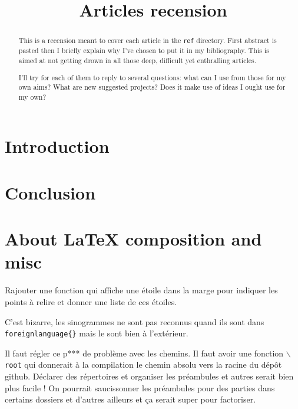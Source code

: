 \documentclass[12pt,onecolumn]{article} %
\title{Articles recension}
\author{}
\begin{document}
\maketitle
{}
\begin{abstract}
\par This is a recension meant to cover each article in the \texttt{ref} directory. First abstract is pasted then I briefly explain why I've chosen to put it in my bibliography. This is aimed at not getting drown in all those deep, difficult yet enthralling articles.\par I'll try for each of them to reply to several questions: what can I use from those for my own aims? What are new suggested projects? Does it make use of ideas I ought use for my own?
\end{abstract}

\tableofcontents
\cleardoublepage

\section*{Introduction}

\section{}


\section*{Conclusion}

\section*{About \LaTeX{} composition and misc}
Rajouter une fonction qui affiche une étoile dans la marge pour indiquer les points à relire et donner une liste de ces étoiles.

C'est bizarre, les sinogrammes ne sont pas reconnus quand ils sont dans \texttt{foreignlanguage\{\}} mais le sont bien à l'extérieur.

Il faut régler ce p*** de problème avec les chemins. Il faut avoir une fonction \texttt{$\backslash$root} qui donnerait à la compilation le chemin absolu vers la racine du dépôt github. Déclarer des répertoires et organiser les préambules et autres serait bien plus facile ! On pourrait saucissonner les préambules pour des parties dans certains dossiers et d'autres ailleurs et ça serait super pour factoriser.


\end{document}
